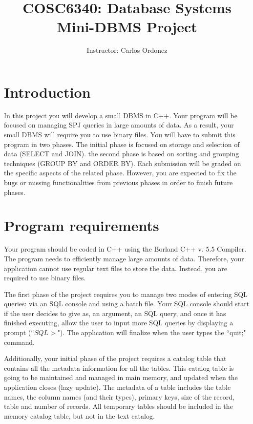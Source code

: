 
\title{COSC6340: Database Systems\\
Mini-DBMS Project
}

\author{Instructor: Carlos Ordonez}
\date{}



\maketitle

\section{Introduction}

In this project you will develop a small DBMS in C++. 
Your program will be focused on managing SPJ queries in
large amounts of data. As a result, your small DBMS
will require you to use binary files.
You will have to submit this program in two phases.
The initial phase is focused on storage and 
selection of data (SELECT and JOIN).
the second phase is based on sorting and 
grouping techniques (GROUP BY and ORDER BY).
Each submission will be graded on the specific aspects of the related phase.
However, you are expected to fix the bugs or missing functionalities
from previous phases in order to finish future phases.

\section{Program requirements}

Your program should be coded in C++ using
the Borland C++ v. 5.5 Compiler.
The program needs to efficiently manage
large amounts of data. Therefore, your application
cannot use regular text files to store the
data. Instead, you are required to use binary files.

The first phase of the project requires you to manage two modes
of entering SQL queries: via an SQL console and using
a batch file. Your SQL console should start if the user decides
to give as, an argument, an SQL query, and once it has finished executing, allow
the user to input more SQL queries by displaying a prompt (``$SQL>$").
The application will finalize when the user types the ``quit;" command.

Additionally, your initial phase of the project requires
a catalog table that contains all the metadata information
for all the tables. This catalog table is going to be
maintained and managed in main memory, and updated
when the application closes (lazy update).
The metadata of a table includes the table names, the column names (and their types),
primary keys, size of the record, table and number of records.
All temporary tables should be included in the memory catalog table, but not in the
text catalog.

